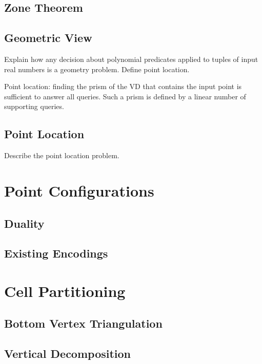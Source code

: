 \section{Zone Theorem}


\section{Geometric View}

Explain how any decision about polynomial predicates applied to tuples of input
real numbers is a geometry problem. Define point location.

Point location: finding the prism of the VD that contains the input point is
sufficient to answer all queries. Such a prism is defined by a linear number of
supporting queries.



\section{Point Location}
Describe the point location problem.


\chapter{Point Configurations}

\section{Duality}


\section{Existing Encodings}





\chapter{Cell Partitioning}

\section{Bottom Vertex Triangulation}


\section{Vertical Decomposition}



